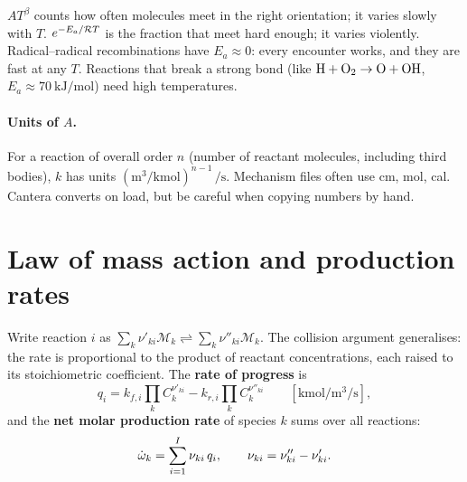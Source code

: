 \begin{intuition}
$A T^\beta$ counts how often molecules meet in the right orientation; it varies slowly with $T$.
$e^{-E_a/\mathcal{R} T}$ is the fraction that meet hard enough; it varies violently. Radical--radical
recombinations have $E_a\approx 0$: every encounter works, and they are fast at any $T$.
Reactions that break a strong bond (like $\mathrm{H}+\mathrm{O_2}\to\mathrm{O}+\mathrm{OH}$,
$E_a\approx\SI{70}{\kilo\joule\per\mole}$) need high temperatures.
\end{intuition}

\paragraph{Units of $A$.} For a reaction of overall order $n$ (number of reactant molecules,
including third bodies), $k$ has units $(\si{\metre\cubed\per\kilo\mole})^{n-1}\,\si{\per\second}$.
Mechanism files often use cm, mol, cal. Cantera converts on load, but be careful when copying
numbers by hand.

\section{Law of mass action and production rates}
\label{sec:massaction}

Write reaction $i$ as $\sum_k\nu'_{ki}\mathcal M_k\rightleftharpoons\sum_k\nu''_{ki}\mathcal M_k$. The
collision argument generalises: the rate is proportional to the product of reactant concentrations,
each raised to its stoichiometric coefficient. The \textbf{rate of progress} is
\begin{equation}
  q_i=k_{f,i}\prod_kC_k^{\nu'_{ki}}-k_{r,i}\prod_kC_k^{\nu''_{ki}}
  \qquad[\si{\kilo\mole\per\metre\cubed\per\second}],
\end{equation}
and the \textbf{net molar production rate} of species $k$ sums over all reactions:
\begin{equation}
  \dot{\omega}_k=\sum_{i=1}^{I}\nu_{ki}\,q_i,\qquad \nu_{ki}=\nu''_{ki}-\nu'_{ki}.
  \label{eq:wdot}
\end{equation}

